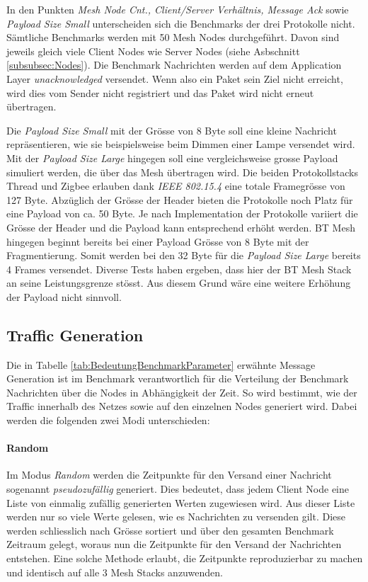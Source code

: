 In den Punkten \textit{Mesh Node Cnt., Client/Server Verhältnis, Message Ack} sowie \textit{Payload Size Small} unterscheiden sich die Benchmarks der drei Protokolle nicht.
Sämtliche Benchmarks werden mit 50 Mesh Nodes durchgeführt. Davon sind jeweils gleich viele Client Nodes wie Server Nodes (siehe Asbschnitt \ref{subsubsec:Nodes}).
Die Benchmark Nachrichten werden auf dem Application Layer \textit{unacknowledged} versendet. Wenn also ein Paket sein Ziel nicht erreicht, wird dies vom Sender nicht registriert und das Paket wird nicht erneut übertragen.

Die \textit{Payload Size Small} mit der Grösse von 8 Byte soll eine kleine Nachricht repräsentieren, wie sie beispielsweise beim Dimmen einer Lampe versendet wird.
Mit der \textit{Payload Size Large} hingegen soll eine vergleichsweise grosse Payload simuliert werden, die über das Mesh übertragen wird.
Die beiden Protokollstacks Thread und Zigbee erlauben dank \textit{IEEE 802.15.4} eine totale Framegrösse von 127 Byte.
Abzüglich der Grösse der Header bieten die Protokolle noch Platz für eine Payload von ca. 50 Byte. Je nach Implementation der Protokolle variiert die Grösse der Header und die Payload kann entsprechend erhöht werden.
BT Mesh hingegen beginnt bereits bei einer Payload Grösse von 8 Byte mit der Fragmentierung. Somit werden bei den 32 Byte für die \textit{Payload Size Large} bereits 4 Frames versendet. Diverse Tests haben ergeben, dass hier der BT Mesh Stack an seine Leistungsgrenze stösst.
Aus diesem Grund wäre eine weitere Erhöhung der Payload nicht sinnvoll.

\subsection{Traffic Generation}\label{subsec:TrafficGeneration}
Die in Tabelle \ref{tab:BedeutungBenchmarkParameter} erwähnte Message Generation ist im Benchmark verantwortlich für die Verteilung der Benchmark Nachrichten über die Nodes in Abhängigkeit der Zeit. So wird bestimmt, wie der Traffic innerhalb des Netzes sowie auf den einzelnen Nodes generiert wird.
Dabei werden die folgenden zwei Modi unterschieden:

\paragraph{Random}
Im Modus \textit{Random} werden die Zeitpunkte für den Versand einer Nachricht sogenannt \textit{pseudozufällig} generiert. Dies bedeutet, dass jedem Client Node eine Liste von einmalig zufällig generierten Werten zugewiesen wird.
Aus dieser Liste werden nur so viele Werte gelesen, wie es Nachrichten zu versenden gilt. Diese werden schliesslich nach Grösse sortiert und über den gesamten Benchmark Zeitraum gelegt, woraus nun die Zeitpunkte für den Versand der Nachrichten entstehen.
Eine solche Methode erlaubt, die Zeitpunkte reproduzierbar zu machen und identisch auf alle 3 Mesh Stacks anzuwenden.

